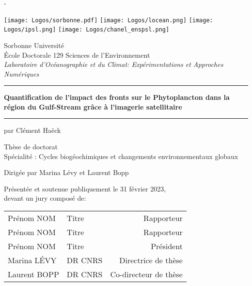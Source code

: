 \documentclass[french, a4paper, 12pt, twoside, openright]{memoir}
\newcommand\Title{Quantification de l'impact des fronts sur le Phytoplancton dans la région du Gulf-Stream grâce à l'imagerie satellitaire}
\begin{document}

\begin{titlingpage}
\calccentering{\unitlength}
\begin{adjustwidth*}{\unitlength}{-\unitlength}

\vspace{-2em}

\begin{center}
  \texttt{[image: Logos/sorbonne.pdf]}
  \hfill
  \texttt{[image: Logos/locean.png]}
  \hfill
  \texttt{[image: Logos/ipsl.png]}
  \hfill
  \texttt{[image: Logos/chanel\_enspsl.png]}

  \vspace{3em}

  {\LARGE Sorbonne Université}\\[2ex]
  École Doctorale 129 Sciences de l'Environnement\\
  \emph{Laboratoire d'Océanographie et du Climat: Expérimentations et Approches Numériques}

  \vspace{3em}

  \par\noindent\rule[0.7em]{\textwidth}{2pt}
  {\bfseries\Large \Title}\\
  \par\noindent\rule{\textwidth}{2pt}

  \vspace{1em}

  {\normalsize par Clément Haëck}\\
  \vspace{3em}

  Thèse de doctorat\\
  Spécialité : Cycles biogéochimiques et changements environnementaux globaux

  \vspace{3em}

  Dirigée par Marina Lévy et Laurent Bopp

  \vspace{3em}
\end{center}

\par\noindent Présentée et soutenue publiquement le 31 février 2023,\\
devant un jury composé de:\\[1ex]
\begin{center}
\begin{tabular}{llr<{\raggedleft}}
  Prénom NOM & Titre & Rapporteur \\
  Prénom NOM & Titre & Rapporteur \\
  Prénom NOM & Titre & Président \\
  Marina LÉVY & DR CNRS & Directrice de thèse \\
  Laurent BOPP & DR CNRS & Co-directeur de thèse \\
\end{tabular}
\end{center}

\end{adjustwidth*}
\end{titlingpage}
\end{document}
